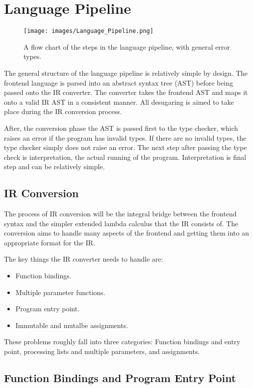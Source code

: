 \documentclass{l4proj}
\begin{document}
\section{Language Pipeline}

\begin{figure}[h]
    \texttt{[image: images/Language\_Pipeline.png]}
    \caption{A flow chart of the steps in the language pipeline, with general error types.}
\end{figure}


The general structure of the language pipeline is relatively simple by design.
The frontend language is parsed into an abstract syntax tree (AST) before being passed onto the IR converter.
The converter takes the frontend AST and maps it onto a valid IR AST in a consistent manner.
All desugaring is aimed to take place during the IR conversion process.

After, the conversion phase the AST is passed first to the type checker, which raises an error if the program has invalid types.
If there are no invalid types, the type checker simply does not raise an error.
The next step after passing the type check is interpretation, the actual running of the program.
Interpretation is final step and can be relatively simple.


\subsection{IR Conversion}

The process of IR conversion will be the integral bridge between the frontend syntax and the simpler extended lambda calculus that the IR consists of.
The conversion aims to handle many aspects of the frontend and getting them into an appropriate format for the IR.

The key things the IR converter needs to handle are:
\begin{itemize}
    \item Function bindings.
    \item Multiple parameter functions.
    \item Program entry point.
    \item Immutable and mutalbe assignments.
\end{itemize}

These problems roughly fall into three categories: Function bindings and entry point, processing lists and multiple parameters, and assignments.

\subsection*{Function Bindings and Program Entry Point}
\end{document}
